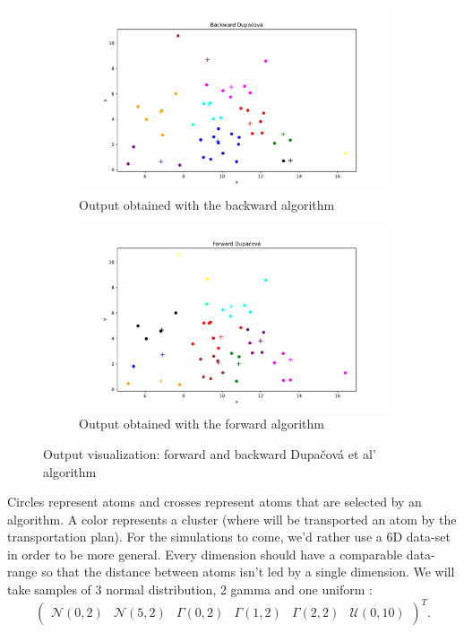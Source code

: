 \documentclass{amsart}
\begin{document}
\begin{figure}[ht]
    \centering
    \begin{subfigure}[b]{0.45\textwidth}
        \centering
        \includegraphics[width=\textwidth]{plots/dupacova backward.pdf}
        \caption{Output obtained with the backward algorithm}
        \label{result back}
    \end{subfigure}
    \hfill
    \begin{subfigure}[b]{0.45\textwidth}
        \centering
        \includegraphics[width=\textwidth]{plots/dupacova forward.pdf}
        \caption{Output obtained with the forward algorithm}
        \label{result forw}
    \end{subfigure}
    \caption{Output visualization: forward and backward Dupačová et al' algorithm}
\end{figure}

Circles represent atoms and crosses represent atoms that are selected by an algorithm. A color represents a cluster (where will be transported an atom by the transportation plan). For the simulations to come, we'd rather use a 6D data-set in order to be more general. Every dimension should have a comparable data-range so that the distance between atoms isn't led by a single dimension. We will take samples of 3 normal distribution, 2 gamma and one uniform :
$$
\begin{pmatrix}
    \mathcal{N}\left(0,2\right) & \mathcal{N}\left(5,2\right) & \Gamma\left(0,2\right) & \Gamma\left(1,2\right) &\Gamma\left(2,2\right) & \mathcal{U}\left(0,10\right)
\end{pmatrix}^T.
$$
\end{document}
